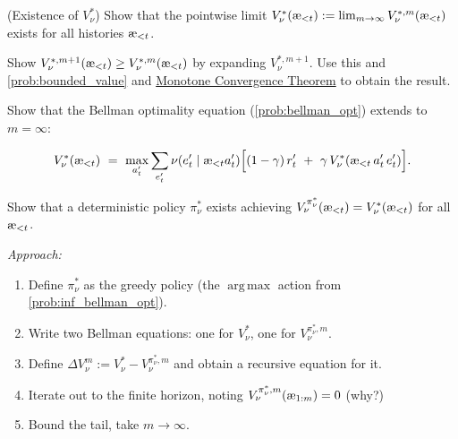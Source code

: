 \documentclass[fontsize=11pt, parskip=half]{scrartcl}
\newcommand{\cA}{\mathcal{A}}
\newcommand{\cE}{\mathcal{E}}
\DeclareMathOperator*{\argmax}{arg\,max}
\newcommand{\aes}{\textnormal{\ae}}
\begin{document}
\begin{exercise}
\label{prob:inf_horizon}
\skippable
(Existence of $V_\nu^*$)
Show that the pointwise limit $V_\nu^*(\aes_{<t}) := \lim_{m \to \infty} V_\nu^{*,m}(\aes_{<t})$ exists for all histories $\aes_{<t}$.


\begin{hint}
Show $V_\nu^{*,m+1}(\aes_{<t}) \geq V_\nu^{*,m}(\aes_{<t})$ by expanding $V_\nu^{*,m+1}$. Use this and \cref{prob:bounded_value}
and \href{https://en.wikipedia.org/wiki/Monotone_convergence_theorem}{Monotone Convergence Theorem} to obtain the result.
\end{hint}
\end{exercise}


\begin{exercise}
\label{prob:inf_bellman_opt}
Show that the Bellman optimality equation (\cref{prob:bellman_opt}) extends to $m = \infty$:

\[
    V_\nu^*(\aes_{<t}) ~=~ \max_{a'_t} \sum_{e'_t} \nu(e'_t \mid \aes_{<t} a'_t) \Big[(1-\gamma)\, r'_t ~+~ \gamma\, V_\nu^*(\aes_{<t}\, a'_t\, e'_t)\Big].
\]

\end{exercise}


\begin{exercise}
\label{prob:inf_opt_policy}
\skippable
Show that a deterministic policy $\pi_\nu^*$ exists achieving $V_\nu^{\pi_\nu^*}(\aes_{<t}) = V_\nu^*(\aes_{<t})$ for all $\aes_{<t}$.


\textit{Approach:}
\begin{enumerate}\itemsep=2pt
    \item Define $\pi_\nu^*$ as the greedy policy (the $\argmax$ action from \cref{prob:inf_bellman_opt}).
    \item Write two Bellman equations: one for $V_\nu^*$, one for $V_\nu^{\pi_\nu^*, m}$.
    \item Define $\Delta V_\nu^m := V_\nu^* - V_\nu^{\pi_\nu^*, m}$ and obtain a recursive equation for it.
    \item Iterate out to the finite horizon, noting $V_\nu^{\pi_\nu^*, m}(\aes_{1:m}) = 0$ (why?)
    \item Bound the tail, take $m \to \infty$.
\end{enumerate}
\end{exercise}
\end{document}
